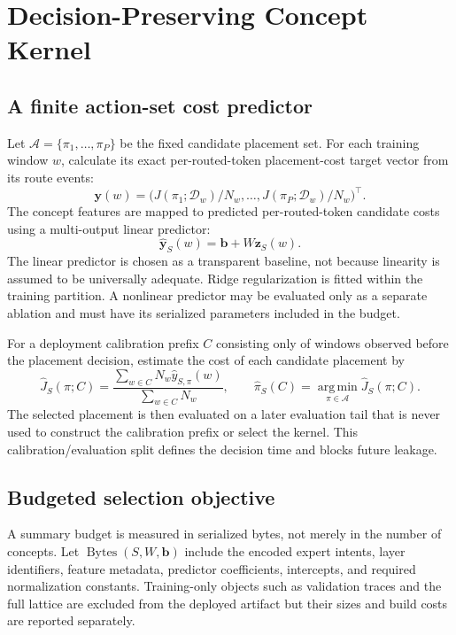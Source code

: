 \documentclass[a4paper,preprint,review,12pt,authoryear]{elsarticle}
\newcommand{\Dcal}{\mathcal{D}}
\newcommand{\PiSet}{\mathcal{A}}
\newcommand{\Bytes}{\operatorname{Bytes}}
\newcommand{\argmin}{\operatorname*{arg\,min}}
\begin{document}
\section{Decision-Preserving Concept Kernel}
\label{sec:dpck}

\subsection{A finite action-set cost predictor}

Let $\PiSet=\{\pi_1,\ldots,\pi_P\}$ be the fixed candidate placement set. For each training window $w$, calculate its exact per-routed-token placement-cost target vector from its route events:
\begin{equation}
 \bm y(w)=\big(J(\pi_1;\Dcal_w)/N_w,\ldots,J(\pi_P;\Dcal_w)/N_w\big)^\top.
\end{equation}
The concept features are mapped to predicted per-routed-token candidate costs using a multi-output linear predictor:
\begin{equation}
 \widehat{\bm y}_{S}(w)=\bm b+W\bm z_S(w).
 \label{eq:predictor}
\end{equation}
The linear predictor is chosen as a transparent baseline, not because linearity is assumed to be universally adequate. Ridge regularization is fitted within the training partition. A nonlinear predictor may be evaluated only as a separate ablation and must have its serialized parameters included in the budget.

For a deployment calibration prefix $C$ consisting only of windows observed before the placement decision, estimate the cost of each candidate placement by
\begin{equation}
 \widehat J_{S}(\pi;C)=\frac{\sum_{w\in C}N_w\widehat y_{S,\pi}(w)}{\sum_{w\in C}N_w},
 \qquad
 \widehat\pi_S(C)=\argmin_{\pi\in\PiSet}\widehat J_S(\pi;C).
 \label{eq:deployment}
\end{equation}
The selected placement is then evaluated on a later evaluation tail that is never used to construct the calibration prefix or select the kernel. This calibration/evaluation split defines the decision time and blocks future leakage.

\subsection{Budgeted selection objective}

A summary budget is measured in serialized bytes, not merely in the number of concepts. Let $\Bytes(S,W,\bm b)$ include the encoded expert intents, layer identifiers, feature metadata, predictor coefficients, intercepts, and required normalization constants. Training-only objects such as validation traces and the full lattice are excluded from the deployed artifact but their sizes and build costs are reported separately.
\end{document}
